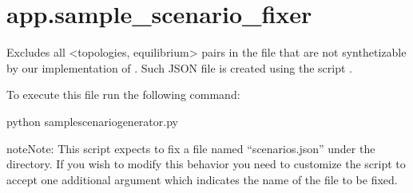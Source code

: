 \documentclass[letterpaper,10pt,english]{sphinxmanual}
\begin{document}
\section{app.sample\_scenario\_fixer}
\label{\detokenize{app:module-sample_scenario_fixer}}\label{\detokenize{app:app-sample-scenario-fixer}}
Excludes all  \textless{}topologies, equilibrium\textgreater{} pairs in the  file
that are not synthetizable by our implementation of
{\hyperref[\detokenize{app.domain.helpers:app.domain.helpers.matrices._metropolis_hastings}]{}}. Such JSON file is created
using the script .

To execute this file run the following command:

\begin{sphinxVerbatim}[commandchars=\\\{\}]
\PYGZdl{} python sample\PYGZus{}scenario\PYGZus{}generator.py
\end{sphinxVerbatim}

\begin{sphinxadmonition}{note}{Note:}
This script expects to fix a file named “scenarios.json” under the
{\hyperref[\detokenize{app:app.environment_settings.RESOURCES_ROOT}]{}} directory. If you wish
to modify this behavior you need to customize the script to accept one
additional argument which indicates the name of the file to be fixed.
\end{sphinxadmonition}
\end{document}
